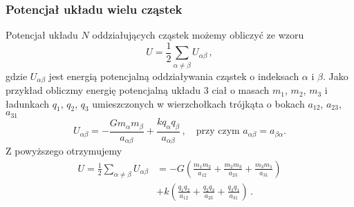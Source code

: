 \documentclass[../main.tex]{subfiles}
\begin{document}
\subsubsection{Potencjał układu wielu cząstek}
Potencjał układu \(N\) oddziałujących cząstek możemy obliczyć ze wzoru
\begin{equation*}
    U=\frac{1}{2}\sum_{\alpha\neq\beta}U_{\alpha\beta}\,,
\end{equation*}
gdzie \(U_{\alpha\beta}\) jest energią potencjalną oddziaływania cząstek o indeksach \(\alpha\) i \(\beta\). Jako przykład obliczmy energię potencjalną układu 3 ciał o masach \(m_1\), \(m_2\), \(m_3\) i ładunkach \(q_1\), \(q_2\), \(q_3\) umieszczonych w wierzchołkach trójkąta o bokach \(a_{12}\), \(a_{23}\), \(a_{31}\)
\begin{equation*}
    U_{\alpha\beta}=-\frac{Gm_\alpha m_\beta}{a_{\alpha\beta}}+\frac{kq_\alpha q_\beta}{a_{\alpha\beta}}\,,\quad\text{przy czym \(a_{\alpha\beta}=a_{\beta\alpha}\).}
\end{equation*}
Z powyższego otrzymujemy
\begin{equation*}
\begin{split}
    U=\frac{1}{2}\sum_{\alpha\neq\beta}U_{\alpha\beta}&=-G\left(\frac{m_1m_2}{a_{12}}+\frac{m_2m_3}{a_{23}}+\frac{m_3m_1}{a_{31}}\right)\\
    &+k\left(\frac{q_1q_2}{a_{12}}+\frac{q_2q_3}{a_{23}}+\frac{q_3q_1}{a_{31}}\right)\,.
\end{split}
\end{equation*}
\end{document}
